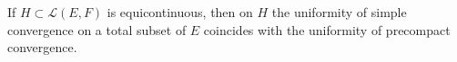 If \(H \subset \mathcal{L}(E, F)\) is equicontinuous, then on \(H\) the uniformity of simple convergence on a total subset of \(E\) coincides with the uniformity of precompact convergence.